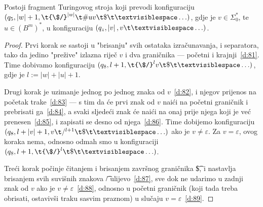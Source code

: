 \begin{lema}\label{lm:faza5}
Postoji fragment Turingovog stroja koji prevodi konfiguraciju $(q_5,\left|w\right|+1,\t{\$/}^{\left|w\right|}\t\#uv\t\$\bl\ldots)$, gdje je $v\in\Sigma_0^*$, te $u\in(B^m)^*$, u konfiguraciju $(q_z,\left|v\right|,v\bl\ldots)$.
\end{lema}
\begin{proof}
Prvi korak se sastoji u "brisanju" svih ostataka izračunavanja, i separatora, tako da jedino "prežive" izlazna riječ $v$ i dva graničnika --- početni i krajnji~\eqref{d:81}. Time dobivamo konfiguraciju $(q_8,l+1,\t{\$/}^{l}v\t\$\bl\ldots)$, gdje je $l:=\left|w\right|+\left|u\right|+1$.

Drugi korak je uzimanje jednog po jednog znaka od $v$~\eqref{d:82}, i njegov prijenos na početak trake~\eqref{d:83} --- s tim da će prvi znak od $v$ naići na početni graničnik i prebrisati ga~\eqref{d:84}, a svaki sljedeći znak će naići na onaj prije njega koji je već prenesen~\eqref{d:85}, i zapisati se desno od njega~\eqref{d:86}. Time dobijemo konfiguraciju $(q_8,l+\left|v\right|+1,v\t/^{l+1}\t\$\bl\ldots)$ ako je $v\not=\varepsilon$. Za $v=\varepsilon$, ovog koraka nema, odnosno odmah smo u konfiguraciji $(q_8,l+1,\t{\$/}^l\t\$\bl\ldots)$.

Treći korak počinje čitanjem i brisanjem završnog graničnika \t\$, i nastavlja brisanjem svih suvišnih znakova \t/ ulijevo~\eqref{d:87}, sve dok ne udarimo u zadnji znak od $v$ ako je $v\not=\varepsilon$~\eqref{d:88}, odnosno u početni graničnik (koji tada treba obrisati, ostavivši traku sasvim praznom) u slučaju $v=\varepsilon$~\eqref{d:89}.


\end{proof}
